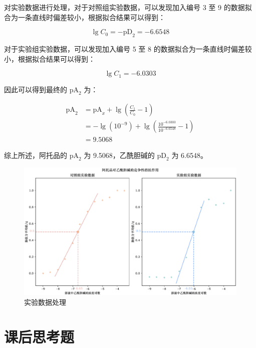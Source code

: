 \documentclass[UTF8]{ctexart}
\begin{document}
对实验数据进行处理，对于对照组实验数据，可以发现加入编号 3 至 9 的数据拟合为一条直线时偏差较小，根据拟合结果可以得到：

$$
    \lg C_0=-\text{pD}_2=-6.6548
$$

对于实验组实验数据，可以发现加入编号 5 至 8 的数据拟合为一条直线时偏差较小，根据拟合结果可以得到：

$$
    \lg C_1=-6.0303
$$

因此可以得到最终的 $\text{pA}_2$ 为：

$$
    \begin{aligned}
        \text{pA}_2&=\text{pA}_x+\lg\left(\frac{C_1}{C_0}-1\right)\\
        &=-\lg(10^{-9})+\lg\left(\frac{10^{-6.0303}}{10^{-6.6548}}-1\right)\\
        &=9.5068
    \end{aligned}
$$

综上所述，阿托品的 $\text{pA}_2$ 为 9.5068，乙酰胆碱的 $\text{pD}_2$ 为 6.6548。

\begin{figure}[H]
    \centering
    \caption{实验数据处理}
    \includegraphics[scale=0.7]{figure-5_svg.pdf}
\end{figure}

\section{课后思考题}
\end{document}
